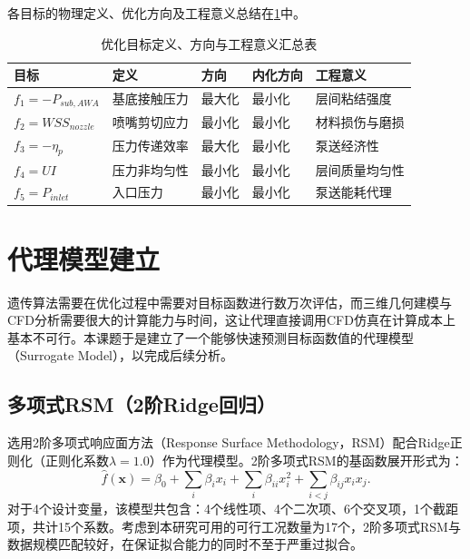各目标的物理定义、优化方向及工程意义总结在\cref{tab:5.2}中。

\begin{table}[!htb]
  \centering
  \caption{优化目标定义、方向与工程意义汇总表}\label{tab:5.2}
  \renewcommand{\arraystretch}{1.3}
  \begin{tabular}{lllll}
    \toprule
    \textbf{目标} & \textbf{定义} & \textbf{方向} & \textbf{内化方向} & \textbf{工程意义} \\
    \midrule
    $f_1 = -P_{sub,AWA}$ & 基底接触压力     & 最大化 & 最小化 & 层间粘结强度 \\
    $f_2 = WSS_{nozzle}$ & 喷嘴剪切应力     & 最小化 & 最小化 & 材料损伤与磨损 \\
    $f_3 = -\eta_p$      & 压力传递效率     & 最大化 & 最小化 & 泵送经济性 \\
    $f_4 = UI$           & 压力非均匀性     & 最小化 & 最小化 & 层间质量均匀性 \\
    $f_5 = P_{inlet}$    & 入口压力         & 最小化 & 最小化 & 泵送能耗代理 \\
    \bottomrule
  \end{tabular}
\end{table}

\section{代理模型建立}

遗传算法需要在优化过程中需要对目标函数进行数万次评估，而三维几何建模与CFD分析需要很大的计算能力与时间，这让代理直接调用CFD仿真在计算成本上基本不可行。本课题于是建立了一个能够快速预测目标函数值的代理模型（Surrogate Model），以完成后续分析。

\subsection{多项式RSM（2阶Ridge回归）}

选用2阶多项式响应面方法（Response Surface Methodology，RSM）配合Ridge正则化（正则化系数$\lambda = 1.0$）作为代理模型。2阶多项式RSM的基函数展开形式为：
\begin{equation}\label{eq:rsm}
  \hat{f}(\mathbf{x}) = \beta_0 + \sum_i \beta_i x_i + \sum_i \beta_{ii} x_i^2 + \sum_{i<j} \beta_{ij} x_i x_j.
\end{equation}
对于4个设计变量，该模型共包含：4个线性项、4个二次项、6个交叉项，1个截距项，共计15个系数。考虑到本研究可用的可行工况数量为17个，2阶多项式RSM与数据规模匹配较好，在保证拟合能力的同时不至于严重过拟合。

